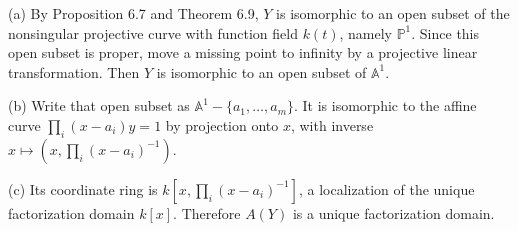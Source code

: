 (a) By Proposition 6.7 and Theorem 6.9, $Y$ is isomorphic to an open subset of the nonsingular projective curve with function field $k(t)$, namely $\mathbb{P}^1$. Since this open subset is proper, move a missing point to infinity by a projective linear transformation. Then $Y$ is isomorphic to an open subset of $\mathbb{A}^1$.

(b) Write that open subset as $\mathbb{A}^1-\{a_1,\ldots,a_m\}$. It is isomorphic to the affine curve $\prod_i(x-a_i)y=1$ by projection onto $x$, with inverse $x\mapsto(x,\prod_i(x-a_i)^{-1})$.

(c) Its coordinate ring is $k[x,\prod_i(x-a_i)^{-1}]$, a localization of the unique factorization domain $k[x]$. Therefore $A(Y)$ is a unique factorization domain.
